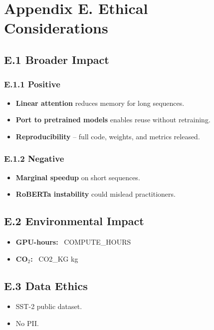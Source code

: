 
\section{Appendix E. Ethical Considerations}

\subsection{E.1 Broader Impact}

\subsubsection{E.1.1 Positive}

\begin{itemize}
\item \textbf{Linear attention} reduces memory for long sequences.
\item \textbf{Port to pretrained models} enables reuse without retraining.
\item \textbf{Reproducibility} -- full code, weights, and metrics released.

\end{itemize}
\subsubsection{E.1.2 Negative}

\begin{itemize}
\item \textbf{Marginal speedup} on short sequences.
\item \textbf{RoBERTa instability} could mislead practitioners.

\end{itemize}
\subsection{E.2 Environmental Impact}

\begin{itemize}
\item \textbf{GPU-hours:} ~{{COMPUTE\_HOURS}}
\item \textbf{CO$_2$:} ~{{CO2\_KG}} kg

\end{itemize}
\subsection{E.3 Data Ethics}

\begin{itemize}
\item SST-2 public dataset.
\item No PII.

\end{itemize}

